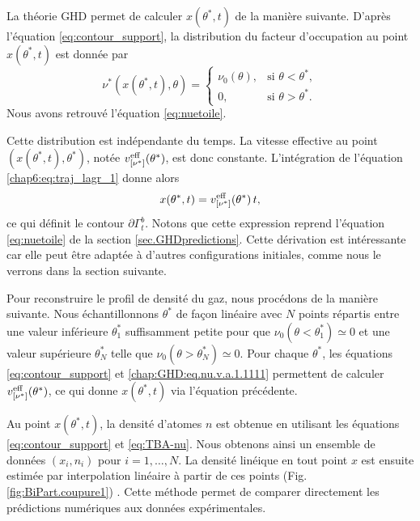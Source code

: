 \medskip

La théorie \gls{GHD} permet de calculer \(x(\theta^*,t)\) de la manière suivante. D’après l’équation \eqref{eq:contour_support}, la distribution du facteur d’occupation au point \(x(\theta^*,t)\) est donnée par
\begin{equation}
\nu^*(x(\theta^*,t) , \theta) =
\begin{cases}
\nu_0(\theta), & \text{si } \theta < \theta^*,\\
0, & \text{si } \theta > \theta^*.
\end{cases}
\end{equation}
Nous avons retrouvé l'équation \eqref{eq:nuetoile}.

\medskip

Cette distribution est indépendante du temps. La vitesse effective au point \((x(\theta^*,t),\theta^*)\), notée \(v^{\rm eff}_{[\nu^*]}(\theta^*)\), est donc constante. L’intégration de l’équation \eqref{chap6:eq:traj_lagr_1} donne alors
\begin{equation}
x(\theta^*,t) =  v^{\rm eff}_{[\nu^*]}(\theta^*) \, t ,
\end{equation}
ce qui définit le contour \(\partial\Gamma_t^b\). Notons que cette expression reprend l’équation \eqref{eq:nuetoile} de la section \ref{sec.GHDpredictions}. Cette dérivation est intéressante car elle peut être adaptée à d’autres configurations initiales, comme nous le verrons dans la section suivante.

\medskip

Pour reconstruire le profil de densité du gaz, nous procédons de la manière suivante. Nous échantillonnons \(\theta^*\) de façon linéaire avec \(N\) points répartis entre une valeur inférieure \(\theta_1^*\) suffisamment petite pour que \(\nu_0(\theta<\theta_1^*)\simeq 0\) et une valeur supérieure \(\theta_N^*\) telle que \(\nu_0(\theta>\theta_N^*)\simeq 0\). Pour chaque \(\theta^*\), les équations \eqref{eq:contour_support} et \eqref{chap:GHD:eq.nu.v.a.1.1111} permettent de calculer \(v^{\rm eff}_{[\nu^*]}(\theta^*)\), ce qui donne \(x(\theta^*,t)\) via l’équation précédente. 

\medskip

Au point \(x(\theta^*,t)\), la densité d’atomes \(n\) est obtenue en utilisant les équations \eqref{eq:contour_support} et \eqref{eq:TBA-nu}. Nous obtenons ainsi un ensemble de données \((x_i,n_i)\) pour \(i=1,\dots,N\). La densité linéique en tout point \(x\) est ensuite estimée par interpolation linéaire à partir de ces points (Fig. \ref{fig:BiPart.coupure1})
.
Cette méthode permet de comparer directement les prédictions numériques aux données expérimentales.

